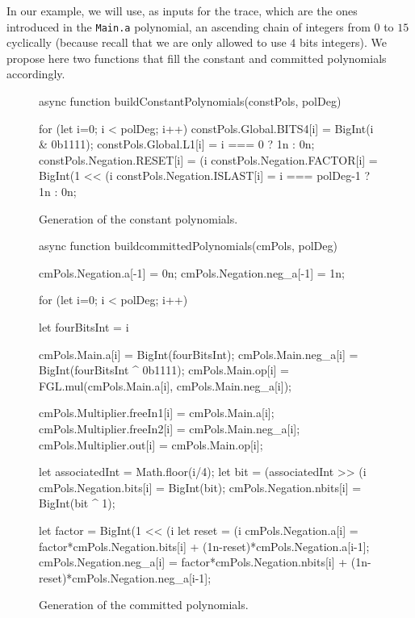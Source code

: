 In our example, we will use, as inputs for the trace, which are the ones introduced in the \texttt{Main.a} polynomial, an ascending chain of integers from $0$ to $15$ cyclically (because recall that we are only allowed to use $4$ bits integers). We propose here two functions that fill the constant and committed polynomials accordingly. 
\begin{figure}[H]
\begin{js}
async function buildConstantPolynomials(constPols, polDeg) {
    
    for (let i=0; i < polDeg; i++) {
        constPols.Global.BITS4[i] = BigInt(i & 0b1111);
        constPols.Global.L1[i] = i === 0 ? 1n : 0n;
        constPols.Negation.RESET[i] = (i %
        constPols.Negation.FACTOR[i] = BigInt(1 << (i %
        constPols.Negation.ISLAST[i] = i === polDeg-1 ? 1n : 0n;
    }
}
\end{js}
\caption{Generation of the constant polynomials.}
\end{figure}

\begin{figure}[H]
\begin{js}
async function buildcommittedPolynomials(cmPols, polDeg) {
        
    cmPols.Negation.a[-1] = 0n;
    cmPols.Negation.neg_a[-1] = 1n;
    
    for (let i=0; i < polDeg; i++) {
        
        let fourBitsInt = i %
        
        cmPols.Main.a[i] = BigInt(fourBitsInt);
        cmPols.Main.neg_a[i] = BigInt(fourBitsInt ^ 0b1111);
        cmPols.Main.op[i] = FGL.mul(cmPols.Main.a[i], cmPols.Main.neg_a[i]);
        
        cmPols.Multiplier.freeIn1[i] = cmPols.Main.a[i];
        cmPols.Multiplier.freeIn2[i] = cmPols.Main.neg_a[i];
        cmPols.Multiplier.out[i] = cmPols.Main.op[i];
        
        let associatedInt = Math.floor(i/4);
        let bit = (associatedInt >> (i%
        cmPols.Negation.bits[i] = BigInt(bit);
        cmPols.Negation.nbits[i] = BigInt(bit ^ 1);
        
        
        let factor = BigInt(1 << (i %
        let reset = (i %
        cmPols.Negation.a[i] = factor*cmPols.Negation.bits[i] 
        + (1n-reset)*cmPols.Negation.a[i-1];
        cmPols.Negation.neg_a[i] = factor*cmPols.Negation.nbits[i] 
        + (1n-reset)*cmPols.Negation.neg_a[i-1];
    }
}
\end{js}
\caption{Generation of the committed polynomials.}
\end{figure}

